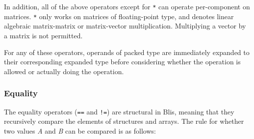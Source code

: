 \documentclass[11pt]{article}
\newcommand{\code}[1]{\texttt{#1}}
\begin{document}
In addition, all of the above operators except for \code{*} can operate per-component on matrices. \code{*} only works on matrices of floating-point type, and denotes linear algebraic matrix-matrix or matrix-vector multiplication. Multiplying a vector by a matrix is not permitted.

For any of these operators, operands of packed type are immediately expanded to their corresponding expanded type before considering whether the operation is allowed or actually doing the operation.

\subsubsection{Equality}

The equality operators (\code{==} and \code{!=}) are structural in Blis, meaning that they recursively compare the elements of structures and arrays. The rule for whether two values \textit{A} and \textit{B} can be compared is as follows:
\end{document}
